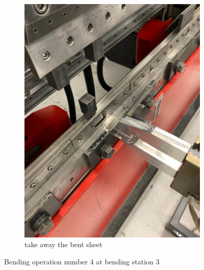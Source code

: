 \begin{figure}[h]
\begin{subfigure}[b]{0.32\textwidth}
        \includegraphics[width=\textwidth]{figures/bending/bending4-003.png}
        \caption{take away the bent sheet}
        \label{subfig:bending4-after}
    \end{subfigure}\hspace{0.1cm}
    \caption{Bending operation number 4 at bending station 3}
    \label{fig:bending-operation-4}
\end{figure}


